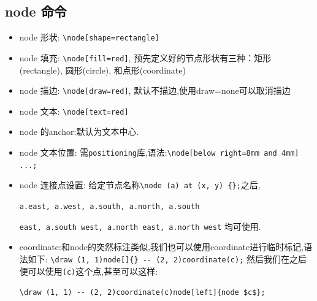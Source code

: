 \documentclass[12pt]{article}
\begin{document}
\subsection{node 命令}
\begin{itemize}
    \item node 形状: \verb|\node[shape=rectangle]|
    \item node 填充: \verb|\node[fill=red]|, 预先定义好的节点形状有三种：矩形(rectangle), 圆形(circle), 和点形(coordinate)
    \item node 描边: \verb|\node[draw=red]|, 默认不描边,使用draw=none可以取消描边
    \item node 文本: \verb|\node[text=red]|
    \item node 的anchor:默认为文本中心.%
    \item node 文本位置: 需\verb|positioning|库,语法:\verb|\node[below right=8mm and 4mm] ...;|
    \item node 连接点设置: 给定节点名称\verb|\node (a) at (x, y) {};|之后,\par 
        \verb|a.east, a.west, a.south, a.north, a.south|\par
        \verb|east, a.south west, a.north east, a.north west|
        均可使用.
    \item coordinate:和node的突然标注类似,我们也可以使用coordinate进行临时标记,语法如下:
        \verb|\draw (1, 1)node[]{} -- (2, 2)coordinate(c);|
        然后我们在之后便可以使用\verb|(c)|这个点,甚至可以这样:\par
        \verb|\draw (1, 1) -- (2, 2)coordinate(c)node[left]{node $c$};|
\end{itemize}
\end{document}
